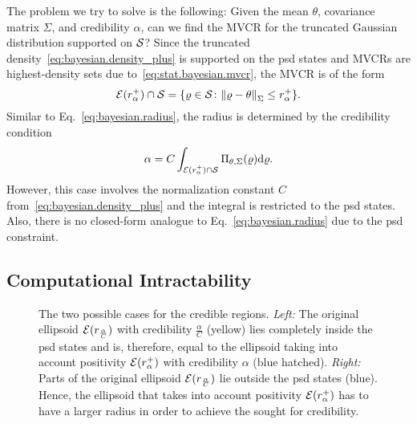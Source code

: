 The problem we try to solve is the following:
Given the mean $\theta$, covariance matrix $\Sigma$, and credibility $\alpha$, can we find the MVCR for the truncated Gaussian distribution supported on $\mathcal{S}$?
Since the truncated density~\eqref{eq:bayesian.density_plus} is supported on the psd states and MVCRs are highest-density sets due to~\eqref{eq:stat.bayesian.mvcr}, the MVCR is of the form
\begin{equation}
  \mathcal{E}(r^+_{\alpha}) \cap \mathcal{S} = \{ \varrho \in \mathcal{S} \colon {\Vert\varrho - \theta\Vert}_\Sigma \le r^+_{\alpha} \}.
  \label{eq:bayesian.mvcr}
\end{equation}
Similar to Eq.~\eqref{eq:bayesian.radius}, the radius is determined by the credibility condition
\begin{equation}
  \label{eq:bayesian.radius_plus}
  \alpha = C \int_{\mathcal{E}(r^+_{\alpha}) \cap \mathcal{S}} \Pi_{\theta,\Sigma}(\varrho) \mathrm{d} \varrho.
\end{equation}
However, this case involves the normalization constant $C$ from~\eqref{eq:bayesian.density_plus} and the integral is restricted to the psd states.
Also, there is no closed-form analogue to Eq.~\eqref{eq:bayesian.radius} due to the psd constraint.

\subsection{Computational Intractability}
\label{sub:bayesian.hard}

\begin{figure*}[t]
  \centering
  
  \caption{\label{fig:bayesian.ellipsoids}
    The two possible cases for the credible regions.
    \emph{Left:} The original ellipsoid $\mathcal{E}(r_\frac{\alpha}{C})$ with credibility $\frac{\alpha}{C}$ (yellow) lies completely inside the psd states and is, therefore, equal to the ellipsoid taking into account positivity $\mathcal{E}(r^+_{\alpha})$ with credibility $\alpha$ (blue hatched).
    \emph{Right:}  Parts of the original ellipsoid $\mathcal{E}(r_\frac{\alpha}{C})$ lie outside the psd states (blue).
    Hence, the ellipsoid that takes into account positivity $\mathcal{E}(r^+_{\alpha})$ has to have a larger radius in order to achieve the sought for credibility.
  }
\end{figure*}


